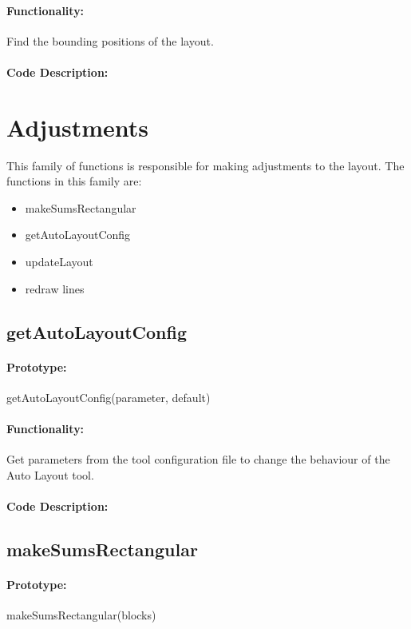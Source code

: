 \documentclass[12pt,letterpaper]{report}
\begin{document}
\paragraph{Functionality:} Find the bounding positions of the layout.
\paragraph{Code Description:}

\section{Adjustments}
\par This family of functions is responsible for making adjustments to the layout. The functions in this family are:
\begin{itemize}
	\item makeSumsRectangular
	\item getAutoLayoutConfig
	\item updateLayout
	\item redraw lines
\end{itemize}

\subsection{getAutoLayoutConfig}
\paragraph{Prototype:} getAutoLayoutConfig(parameter, default)
\paragraph{Functionality:} Get parameters from the tool configuration file to change the behaviour of the Auto Layout tool.
\paragraph{Code Description:}

\subsection{makeSumsRectangular}
\paragraph{Prototype:} makeSumsRectangular(blocks)
\end{document}
